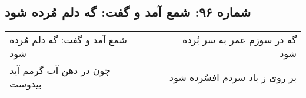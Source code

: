 \begin{center}
\section*{شماره ۹۶: شمع آمد و گفت: گه دلم مُرده شود}
\label{sec:096}
\begin{longtable}{l p{0.5cm} r}
شمع آمد و گفت: گه دلم مُرده شود
&&
گه در سوزم عمر به سر بُرده شود
\\
چون در دهن آب گرمم آید بیدوست
&&
بر روی ز باد سردم افسُرده شود
\\
\end{longtable}
\end{center}
